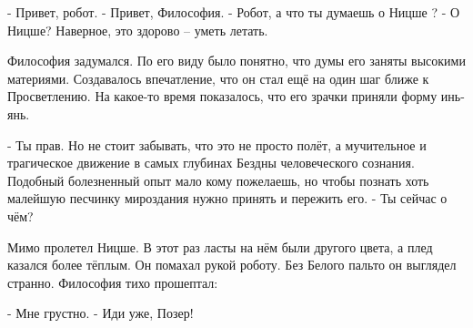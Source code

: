 - Привет, робот.
- Привет, Философия.
- Робот, а что ты думаешь о Ницше ?
- О Ницше? Наверное, это здорово – уметь летать.

Философия задумался. По его виду было понятно, что думы его заняты высокими материями. Создавалось впечатление, что он стал ещё на один шаг ближе к Просветлению. На какое-то время показалось, что его зрачки приняли форму инь-янь.

- Ты прав. Но не стоит забывать, что это не просто полёт, а мучительное и трагическое движение в самых глубинах Бездны человеческого сознания. Подобный болезненный опыт мало кому пожелаешь, но чтобы познать хоть малейшую песчинку мироздания нужно принять и пережить его.
- Ты сейчас о чём?

Мимо пролетел Ницше. В этот раз ласты на нём были другого цвета, а плед казался более тёплым. Он помахал рукой роботу. Без Белого пальто он выглядел странно. Философия тихо прошептал:

- Мне грустно.
- Иди уже, Позер!